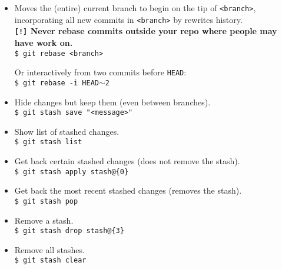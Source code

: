 \begin{itemize}[label={-}, leftmargin=*]
\item Moves the (entire) current branch to begin on the tip of {\tt <branch>}, incorporating all new commits in {\tt <branch>} by rewrites history.\\
\textbf{{\tt[!]} Never rebase commits outside your repo where people may have work on.}\\
{\tt \$ git rebase <branch>}

Or interactively from two commits before {\tt HEAD}:\\
{\tt \$ git rebase -i HEAD$\sim$2}

\hr

\item Hide changes but keep them (even between branches).\\
{\tt \$ git stash save "<message>"}

\item Show list of stashed changes.\\
{\tt \$ git stash list}

\item Get back certain stashed changes (does not remove the stash).\\
{\tt \$ git stash apply stash@\{0\}}

\item Get back the most recent stashed changes (removes the stash).\\
{\tt \$ git stash pop}

\item Remove a stash.\\
{\tt \$ git stash drop stash@\{3\}}

\item Remove all stashes.\\
{\tt \$ git stash clear}


\end{itemize}    